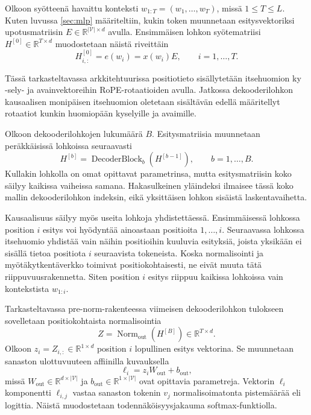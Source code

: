 Olkoon syötteenä havaittu konteksti \(w_{1:T} = (w_1, \dots, w_T)\),
missä \(1 \le T \le L\). Kuten luvussa \ref{sec:mlp} määriteltiin, kukin
token muunnetaan esitysvektoriksi upotusmatriisin
\(E \in \mathbb{R}^{|\mathcal{V}| \times d}\) avulla. Ensimmäisen lohkon
syötematriisi \(H^{[0]} \in \mathbb{R}^{T \times d}\) muodostetaan näistä
riveittäin
$$
H^{[0]}_{i,:} = e(w_i) = x(w_i)E, \qquad i = 1, \dots, T.
$$

Tässä tarkasteltavassa arkkitehtuurissa positiotieto sisällytetään
itsehuomion ky\\-sely- ja avainvektoreihin RoPE-rotaatioiden avulla.
Jatkossa dekooderilohkon kausaalisen monipäisen
itsehuomion oletetaan sisältävän edellä määritellyt rotaatiot
kunkin huomiopään kyselyille ja avaimille.

Olkoon dekooderilohkojen lukumäärä \(B\). Esitysmatriisia
muunnetaan peräkkäisissä lohkoissa seuraavasti
$$
H^{[b]}
=
\operatorname{DecoderBlock}_b
\left(H^{[b-1]}\right),
\qquad
b=1,\dots,B.
$$
Kullakin lohkolla on omat opittavat parametrinsa, mutta
esitysmatriisin koko säilyy kaikissa vaiheissa samana.
Hakasulkeinen yläindeksi ilmaisee tässä koko mallin
dekooderilohkon indeksin, eikä yksittäisen lohkon sisäistä
laskentavaihetta.

Kausaalisuus säilyy myös useita lohkoja yhdistettäessä.
Ensimmäisessä lohkossa position \(i\) esitys voi hyödyntää
ainoastaan positioita \(1,\dots,i\). Seuraavassa lohkossa
itsehuomio yhdistää vain näihin positioihin kuuluvia esityksiä,
joista yksikään ei sisällä tietoa positiota \(i\) seuraavista
tokeneista. Koska normalisointi ja myötäkytkentäverkko toimivat
positiokohtaisesti, ne eivät muuta tätä riippuvuusrakennetta.
Siten position \(i\) esitys riippuu kaikissa lohkoissa vain
kontekstista \(w_{1:i}\).

Tarkasteltavassa pre-norm-rakenteessa viimeisen dekooderilohkon
tulokseen sovelletaan positiokohtaista normalisointia
$$
Z
=
\operatorname{Norm}_{\mathrm{out}}
\left(H^{[B]}\right)
\in
\mathbb{R}^{T \times d}.
$$
Olkoon \(z_i = Z_{i,:} \in \mathbb{R}^{1 \times d}\) position \(i\)
lopullinen esitys vektorina. Se muunnetaan sanaston
ulottuvuuteen affiinilla kuvauksella
$$
\ell_i
=
z_i W_{\mathrm{out}} + b_{\mathrm{out}},
$$
missä \(W_{\mathrm{out}} \in \mathbb{R}^{d \times |\mathcal{V}|}\)
ja \(b_{\mathrm{out}} \in \mathbb{R}^{1 \times |\mathcal{V}|}\)
ovat opittavia parametreja. Vektorin \(\ell_i\) komponentti
\(\ell_{i,j}\) vastaa sanaston tokenin \(v_j\) normalisoimatonta
pistemäärää eli logittia. Näistä muodostetaan todennäköisyysjakauma
softmax-funktiolla.

